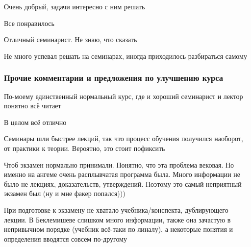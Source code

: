             \begin{commentbox} 
                Очень добрый, задачи интересно с ним решать 
            \end{commentbox} 
        
            \begin{commentbox} 
                Все понравилось 
            \end{commentbox} 
        
            \begin{commentbox} 
                Отличный семинарист. Не знаю, что сказать 
            \end{commentbox} 
        
            \begin{commentbox} 
                Не много успевал решать на семинарах, иногда приходилось разбираться самому 
            \end{commentbox} 
        

    \subsubsection{Прочие комментарии и предложения по улучшению курса}
        \begin{commentbox}
            По-моему единственный нормальный курс, где и хороший семинарист и лектор понятно всё читает
        \end{commentbox}

        \begin{commentbox}
            В целом всё отлично 
        \end{commentbox}

        \begin{commentbox}
            Семинары шли быстрее лекций, так что процесс обучения получился наоборот, от практики к теории. Вероятно, это стоит пофиксить
        \end{commentbox}

        \begin{commentbox}
            Чтоб экзамен нормально принимали. Понятно, что эта проблема вековая. Но именно на ангеме очень расплывчатая программа была. Много информации не было не лекциях, доказательств, утверждений. Поэтому это самый неприятный экзамен был (ну и мне факер попался)))
        \end{commentbox}

        \begin{commentbox}
            При подготовке к экзамену не хватало учебника/конспекта, дублирующего лекции. В Беклемишеве слишком много информации, также она зачастую в непривычном порядке (учебник всё-таки по линалу), а некоторые понятия и определения вводятся совсем по-другому
        \end{commentbox}
